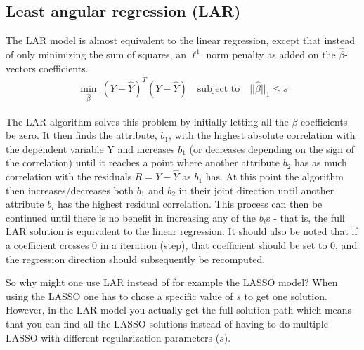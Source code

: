 \subsection{Least angular regression (LAR)}
The LAR model is almost equivalent to the linear regression, except that instead of only minimizing the sum of squares, an $\ell^1$ norm penalty as added on the $\hat{\beta}$-vectors coefficients.
\begin{align}
\min_{\hat{\beta}}\ (Y - \hat{Y})^T (Y - \hat{Y}) \quad \text{subject to} \quad ||\hat{\beta}||_1 \le s
\end{align}

The LAR algorithm \cite{LAR-algorithm} solves this problem by initially letting all the $\beta$ coefficients be zero.
It then finds the attribute, $b_1$, with the highest absolute correlation with the dependent variable Y and increases $b_1$  (or decreases depending on the sign of the correlation)
until it reaches a point where another attribute $b_2$ has as much  correlation with the residuals $R=Y-\hat{Y}$ as  $b_1$ has.
At this point the algorithm then increases/decreases both $b_1$ and $b_2$ in their joint direction until another attribute $b_i$ has the highest residual correlation.
This process can then be continued until there is no benefit in increasing any of the $b_i$s - that is, the full LAR solution is equivalent to the linear regression.
It should also be noted that if a coefficient crosses 0 in a iteration (step),
that coefficient should be set to 0, and the regression direction  should subsequently be recomputed.

So why might one use LAR instead of for example the LASSO model? 
When using the LASSO one has to chose a specific value of $s$ to get one solution.
However, in the LAR model you actually get the full solution path which means that you can find all the LASSO solutions instead of having to do multiple LASSO with different regularization parameters ($s$).
